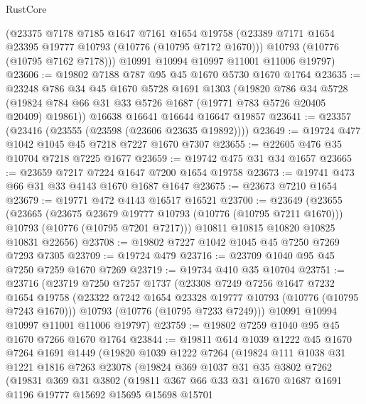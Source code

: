 \begin{lexlean}{RustCore}
\begin{coremodule}
      (@23375
        @7178
        @7185
        @1647
        @7161
        @1654
        @19758
        (@23389 @7171 @1654 @23395 @19777 @10793 (@10776 (@10795 @7172 @1670)))
        @10793
        (@10776 (@10795 @7162 @7178)))
      @10991
      @10994
      @10997
      @11001
      @11006
      @19797)
@23606 := @19802 @7188 @787 @95 @45 @1670 @5730 @1670 @1764
@23635 := @23248
    @786
    @34
    @45
    @1670
    @5728
    @1691
    @1303
    (@19820
      @786
      @34
      @5728
      (@19824 @784 @66 @31 @33 @5726 @1687 (@19771 @783 @5726 @20405 @20409) @19861))
    @16638
    @16641
    @16644
    @16647
    @19857
@23641 := @23357 (@23416 (@23555 (@23598 (@23606 @23635 @19892))))
@23649 := @19724 @477 @1042 @1045 @45 @7218 @7227 @1670 @7307
@23655 := @22605 @476 @35 @10704 @7218 @7225 @1677
@23659 := @19742 @475 @31 @34 @1657
@23665 := @23659 @7217 @7224 @1647 @7200 @1654 @19758
@23673 := @19741 @473 @66 @31 @33 @4143 @1670 @1687 @1647
@23675 := @23673 @7210 @1654
@23679 := @19771 @472 @4143 @16517 @16521
@23700 := @23649
    (@23655
      (@23665
        (@23675 @23679 @19777 @10793 (@10776 (@10795 @7211 @1670)))
        @10793
        (@10776 (@10795 @7201 @7217)))
      @10811
      @10815
      @10820
      @10825
      @10831
      @22656)
@23708 := @19802 @7227 @1042 @1045 @45 @7250 @7269 @7293 @7305
@23709 := @19724 @479
@23716 := @23709 @1040 @95 @45 @7250 @7259 @1670 @7269
@23719 := @19734 @410 @35 @10704
@23751 := @23716
    (@23719
      @7250
      @7257
      @1737
      (@23308
        @7249
        @7256
        @1647
        @7232
        @1654
        @19758
        (@23322 @7242 @1654 @23328 @19777 @10793 (@10776 (@10795 @7243 @1670)))
        @10793
        (@10776 (@10795 @7233 @7249)))
      @10991
      @10994
      @10997
      @11001
      @11006
      @19797)
@23759 := @19802 @7259 @1040 @95 @45 @1670 @7266 @1670 @1764
@23844 := @19811
    @614
    @1039
    @1222
    @45
    @1670
    @7264
    @1691
    @1449
    (@19820
      @1039
      @1222
      @7264
      (@19824
        @111
        @1038
        @31
        @1221
        @1816
        @7263
        @23078
        (@19824
          @369
          @1037
          @31
          @35
          @3802
          @7262
          (@19831
            @369
            @31
            @3802
            (@19811
              @367
              @66
              @33
              @31
              @1670
              @1687
              @1691
              @1196
              @19777
              @15692
              @15695
              @15698
              @15701

\end{coremodule}
\end{lexlean}
